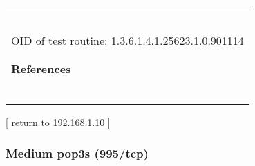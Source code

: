 \documentclass{article}
\begin{document}
\begin{longtable}{|p{}|}
\rowcolor{white}{\verb=  Solution:=}\\
\rowcolor{white}{\verb=  Upgrade to the latest version of Apache Tomcat 5.5.30 or 6.0.27 or later,=}\\
\rowcolor{white}{\verb=  For updates refer to http://tomcat.apache.org=}\\
\rowcolor{white}{\verb==}\\
\rowcolor{white}{\verb==}\\
\\
OID of test routine: 1.3.6.1.4.1.25623.1.0.901114\\
\\

      \hline
      \\
\textbf{References}\\
\rowcolor{white}{\verb=CVE: CVE-2010-1157=}\\
\rowcolor{white}{\verb=BID:39635=}\\
\rowcolor{white}{\verb=Other:=}\\
\rowcolor{white}{\verb=  URL:http://tomcat.apache.org/security-5.html=}\\
\rowcolor{white}{\verb=   URL:http://tomcat.apache.org/security-6.html=}\\
\rowcolor{white}{\verb=   URL:http://www.securityfocus.com/archive/1/510879=}\\
\end{longtable}

\begin{footnotesize}\hyperref[host:192.168.1.10]{[ return to 192.168.1.10 ]}\end{footnotesize}
\subsubsection{Medium pop3s (995/tcp)}
\label{port:192.168.1.10 pop3s (995/tcp) Medium}
\end{document}
